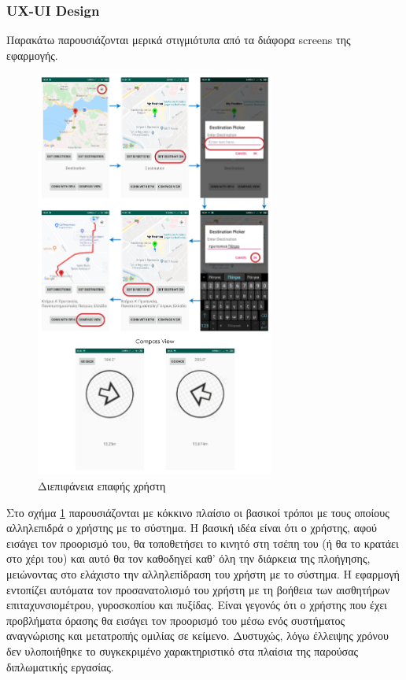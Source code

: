 \subsubsection{UX-UI Design}
Παρακάτω παρουσιάζονται μερικά στιγμιότυπα από τα διάφορα screens της εφαρμογής.
\begin{figure}[H]
    \centering
    \includegraphics[width=0.7\textwidth]{images/ui_app.png}
    \caption{Διεπιφάνεια επαφής χρήστη}
    \label{fig:ui-app}
\end{figure}

Στο σχήμα \ref{fig:ui-app} παρουσιάζονται με κόκκινο πλαίσιο οι βασικοί τρόποι με τους οποίους αλληλεπιδρά ο χρήστης με το σύστημα. Η βασική ιδέα είναι ότι ο χρήστης, αφού εισάγει τον προορισμό του, θα τοποθετήσει το κινητό στη τσέπη του (ή θα το κρατάει στο χέρι του) και αυτό θα τον καθοδηγεί καθ' όλη την διάρκεια της πλοήγησης, μειώνοντας στο ελάχιστο την αλληλεπίδραση του χρήστη με το σύστημα. Η εφαρμογή εντοπίζει αυτόματα τον προσανατολισμό του χρήστη με τη βοήθεια των αισθητήρων επιταχυνσιομέτρου, γυροσκοπίου και πυξίδας. Είναι γεγονός ότι ο χρήστης που έχει προβλήματα όρασης θα εισάγει τον προορισμό του μέσω ενός συστήματος αναγνώρισης και μετατροπής ομιλίας σε κείμενο. Δυστυχώς, λόγω έλλειψης χρόνου δεν υλοποιήθηκε το συγκεκριμένο χαρακτηριστικό στα πλαίσια της παρούσας διπλωματικής εργασίας.

